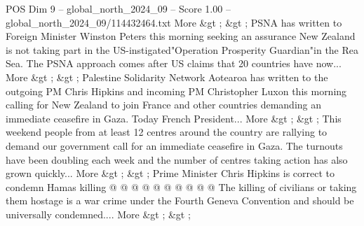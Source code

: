 \begin{textsample}{POS Dim 9 – global\_north\_2024\_09 – Score 1.00 – global\_north\_2024\_09/114432464.txt}
More \&gt ; \&gt ; PSNA has written to Foreign Minister Winston Peters this morning seeking an assurance New Zealand is not taking part in the US-instigated"Operation Prosperity Guardian"in the Rea Sea.
The PSNA approach comes after US claims that 20 countries have now...
More \&gt ; \&gt ; Palestine Solidarity Network Aotearoa has written to the outgoing PM Chris Hipkins and incoming PM Christopher Luxon this morning calling for New Zealand to join France and other countries demanding an immediate ceasefire in Gaza.
Today French President...
More \&gt ; \&gt ; This weekend people from at least 12 centres around the country are rallying to demand our government call for an immediate ceasefire in Gaza.
The turnouts have been doubling each week and the number of centres taking action has also grown quickly...
More \&gt ; \&gt ; Prime Minister Chris Hipkins is correct to condemn Hamas killing @ @ @ @ @ @ @ @ @ @ The killing of civilians or taking them hostage is a war crime under the Fourth Geneva Convention and should be universally condemned....
More \&gt ; \&gt ;

\end{textsample}

